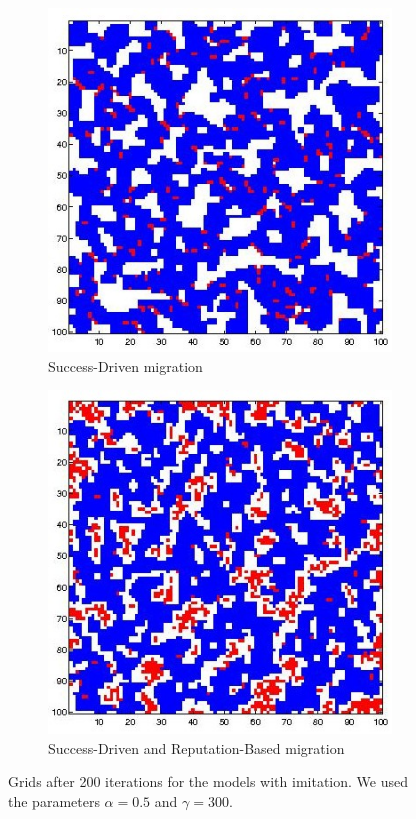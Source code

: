 \documentclass[11pt]{article}
\begin{document}
\begin{figure}[H]
	\begin{subfigure}[t]{0.3\textwidth}
        \includegraphics[width=\textwidth]{../../other/grids/m2-t200-a5-g300.jpg}
	\caption{Success-Driven migration}
	\label{fig:grids_imitation2}
    	\end{subfigure}
	\begin{subfigure}[t]{0.3\textwidth}
        \includegraphics[width=\textwidth]{../../other/grids/m6-t200-a5-g300.jpg}
	\caption{Success-Driven and Reputation-Based migration}
	\label{fig:grids_imitation6}
    	\end{subfigure}

	\caption{Grids after 200 iterations for the models with imitation. We used the parameters $\alpha = 0.5$ and $\gamma = 300$.}
	\label{fig:grids_imitation}
\end{figure}
\end{document}
